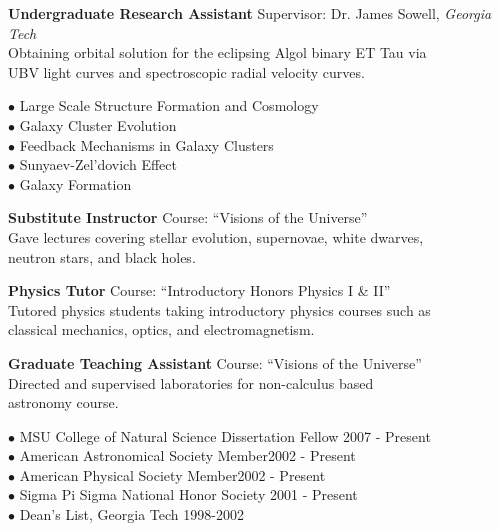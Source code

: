 \documentclass[12pt]{cv}
\begin{document}
\begin{llist}
{\sc \bf{Undergraduate Research Assistant}}
Supervisor: Dr. James Sowell, {\textit{Georgia Tech}}\\
Obtaining orbital solution for the eclipsing Algol binary ET Tau via\\
UBV light curves and spectroscopic radial velocity curves.


$\bullet$ Large Scale Structure Formation and Cosmology\\
$\bullet$ Galaxy Cluster Evolution\\
$\bullet$ Feedback Mechanisms in Galaxy Clusters\\
$\bullet$ Sunyaev-Zel'dovich Effect\\
$\bullet$ Galaxy Formation


{\sc \bf{Substitute Instructor}}
Course: ``Visions of the Universe''\\
Gave lectures covering stellar evolution, supernovae, white dwarves,\\
neutron stars, and black holes.

{\sc \bf{Physics Tutor}}
Course: ``Introductory Honors Physics I \& II''\\
Tutored physics students taking introductory physics courses such as\\
classical mechanics, optics, and electromagnetism.

{\sc \bf{Graduate Teaching Assistant}}
Course: ``Visions of the Universe''\\
Directed and supervised laboratories for non-calculus based\\
astronomy course.



$\bullet$ MSU College of Natural Science Dissertation Fellow \hfill 2007 - Present\\
$\bullet$ American Astronomical Society Member\hfill 2002 - Present\\
$\bullet$ American Physical Society Member\hfill 2002 - Present\\
$\bullet$ Sigma Pi Sigma National Honor Society \hfill 2001 - Present\\
$\bullet$ Dean's List, Georgia Tech \hfill 1998-2002


\end{llist}
\end{document}
